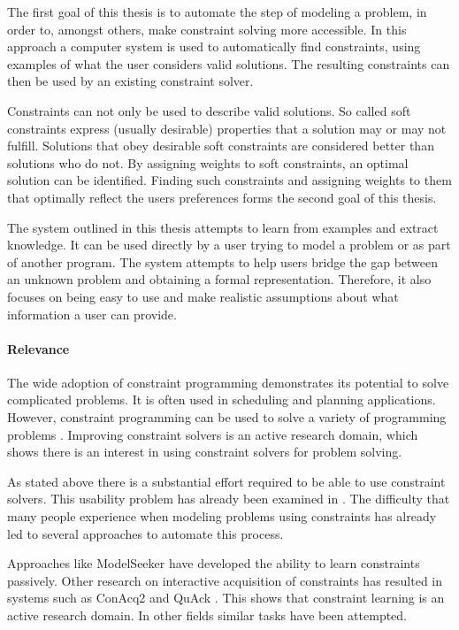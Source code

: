 The first goal of this thesis is to automate the step of modeling a problem, in order to, amongst others, make constraint solving more accessible. In this approach a computer system is used to automatically find constraints, using examples of what the user considers valid solutions. The resulting constraints can then be used by an existing constraint solver.

Constraints can not only be used to describe valid solutions. So called soft constraints express (usually desirable) properties that a solution may or may not fulfill. Solutions that obey desirable soft constraints are considered better than solutions who do not. By assigning weights to soft constraints, an optimal solution can be identified. Finding such constraints and assigning weights to them that optimally reflect the users preferences forms the second goal of this thesis. 

The system outlined in this thesis attempts to learn from examples and extract knowledge. It can be used directly by a user trying to model a problem or as part of another program. The system attempts to help users bridge the gap between an unknown problem and obtaining a formal representation. Therefore, it also focuses on being easy to use and make realistic assumptions about what information a user can provide. 

\paragraph{Relevance}
The wide adoption of constraint programming demonstrates its potential to solve complicated problems. It is often used in scheduling and planning applications. However, constraint programming can be used to solve a variety of programming problems \cite{Dymchenki:GoogleCodeJamEclipse}. Improving constraint solvers is an active research domain, which shows there is an interest in using constraint solvers for problem solving.

As stated above there is a substantial effort required to be able to use constraint solvers. This usability problem has already been examined in \cite{Wallace:PrinciplesCP}. The difficulty that many people experience when modeling problems using constraints has already led to several approaches to automate this process.

Approaches like  ModelSeeker \cite{Beldiceanu:ModelSeeker} have developed the ability to learn constraints passively.
Other research on interactive acquisition of constraints has resulted in systems such as ConAcq2 \cite{bessiere2007query} and QuAck \cite{bessiere2007query}.
This shows that constraint learning is an active research domain.
In other fields similar tasks have been attempted.

